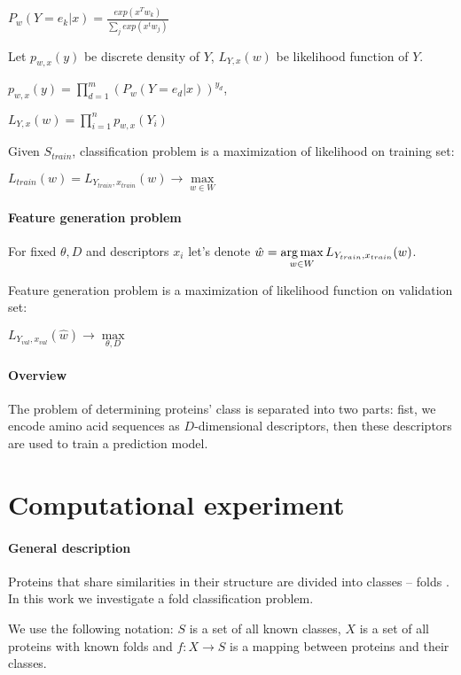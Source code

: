 \documentclass[12pt, twoside]{article}
\begin{document}
$P_w(Y = e_k| x) = \frac{exp(x^Tw_k)}{\sum_j exp(x^t w_j)}$

Let $p_{w, x}(y)$ be discrete density of $Y$, $L_{Y, x}(w)$ be likelihood function of $Y$.  

$p_{w, x}(y) = \prod_{d = 1}^{m} (P_w(Y = e_d| x))^{y_d}$, 

$L_{Y, x}(w) = \prod_{i = 1}^{n} p_{w, x}(Y_i)$

Given $S_{train}$, classification problem is a maximization of likelihood on training set: 

$L_{train}(w) = L_{Y_{train}, x_{train}}(w) \rightarrow \max\limits_{w \in W}$

\paragraph{Feature generation problem}
\noindent

For fixed $\theta, D$ and descriptors $x_i$ let's denote $\hat{w} = \argmax\limits_{w \in W} L_{Y_{train}, x_{train}}(w)$.  

Feature generation problem is a maximization of likelihood function on validation set:  

$L_{Y_{val}, x_{val}}(\hat{w}) \rightarrow \max\limits_{\theta, D}$

\paragraph{Overview}
\noindent

The problem of determining proteins' class is separated into two parts: fist, we encode amino acid sequences as $D$-dimensional descriptors, then these descriptors are used to train a prediction model.  

\section{Computational experiment}
\paragraph{General description}
\noindent
Proteins that share similarities in their structure are  divided into classes -- folds \cite{Schaeffer2011}. In this work we investigate a fold classification problem.  

We use the following notation: $S$ is a set of all known classes, $X$ is a set of all proteins with known folds and  $f: X \rightarrow S$ is a mapping between proteins and their classes. 
\end{document}
